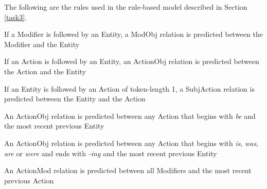 \documentclass[11pt,a4paper]{article}
\newcounter{Lcount}
\newcommand{\squishenum}{
\begin{list}{\arabic{Lcount}. }
{ \usecounter{Lcount}
\setlength{\itemsep}{0pt}
\setlength{\parsep}{0pt}
\setlength{\topsep}{0pt}
\setlength{\partopsep}{0pt}
\setlength{\leftmargin}{2em}
\setlength{\labelwidth}{1.5em}
\setlength{\labelsep}{0.5em} } }
\newcommand{\squishend}{
  \end{list}  }
\begin{document}
The following are the rules used in the rule-based model described in Section \ref{task3}.
\label{rules}
\squishenum
\item If a Modifier is followed by an Entity, a ModObj relation is predicted between the Modifier and the Entity
\item If an Action is followed by an Entity, an ActionObj relation is predicted between the Action and the Entity
\item If an Entity is followed by an Action of token-length 1, a SubjAction relation is predicted between the Entity and the Action
\item An ActionObj relation is predicted between any Action that begins with \emph{be} and the most recent previous Entity
\item An ActionObj relation is predicted between any Action that begins with \emph{is}, \emph{was}, \emph{are} or \emph{were} and ends with \emph{-ing} and the most recent previous Entity
\item An ActionMod relation is predicted between all Modifiers and the most recent previous Action
\squishend
\phantom{.}
\end{document}
